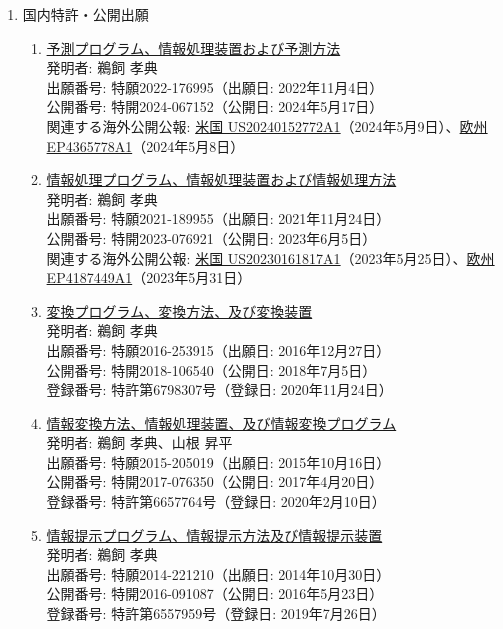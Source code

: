 \documentclass[dvipdfmx]{jlreq}
\begin{document}
\begin{enumerate}[label=\arabic*,align=parleft]
\begin{enumerate}
\end{enumerate}
\item 国内特許・公開出願
\begin{enumerate}
\item \href{https://patents.google.com/patent/JP2024067152A/ja}{予測プログラム、情報処理装置および予測方法}\\発明者: 鵜飼 孝典\\出願番号: 特願2022-176995（出願日: 2022年11月4日）\\公開番号: 特開2024-067152（公開日: 2024年5月17日）\\関連する海外公開公報: \href{https://patents.google.com/patent/US20240152772A1/en}{米国 US20240152772A1}（2024年5月9日）、\href{https://patents.google.com/patent/EP4365778A1/en}{欧州 EP4365778A1}（2024年5月8日）
\item \href{https://patents.google.com/patent/JP2023076921A/ja}{情報処理プログラム、情報処理装置および情報処理方法}\\発明者: 鵜飼 孝典\\出願番号: 特願2021-189955（出願日: 2021年11月24日）\\公開番号: 特開2023-076921（公開日: 2023年6月5日）\\関連する海外公開公報: \href{https://patents.google.com/patent/US20230161817A1/en}{米国 US20230161817A1}（2023年5月25日）、\href{https://patents.google.com/patent/EP4187449A1/en}{欧州 EP4187449A1}（2023年5月31日）
\item \href{https://jglobal.jst.go.jp/detail?JGLOBAL_ID=202103009249580676}{変換プログラム、変換方法、及び変換装置}\\発明者: 鵜飼 孝典\\出願番号: 特願2016-253915（出願日: 2016年12月27日）\\公開番号: 特開2018-106540（公開日: 2018年7月5日）\\登録番号: 特許第6798307号（登録日: 2020年11月24日）
\item \href{https://jglobal.jst.go.jp/detail?JGLOBAL_ID=202003013595461942}{情報変換方法、情報処理装置、及び情報変換プログラム}\\発明者: 鵜飼 孝典、山根 昇平\\出願番号: 特願2015-205019（出願日: 2015年10月16日）\\公開番号: 特開2017-076350（公開日: 2017年4月20日）\\登録番号: 特許第6657764号（登録日: 2020年2月10日）
\item \href{https://jglobal.jst.go.jp/detail?JGLOBAL_ID=201903009240887681}{情報提示プログラム、情報提示方法及び情報提示装置}\\発明者: 鵜飼 孝典\\出願番号: 特願2014-221210（出願日: 2014年10月30日）\\公開番号: 特開2016-091087（公開日: 2016年5月23日）\\登録番号: 特許第6557959号（登録日: 2019年7月26日）

\end{enumerate}
\end{enumerate}
\end{document}
